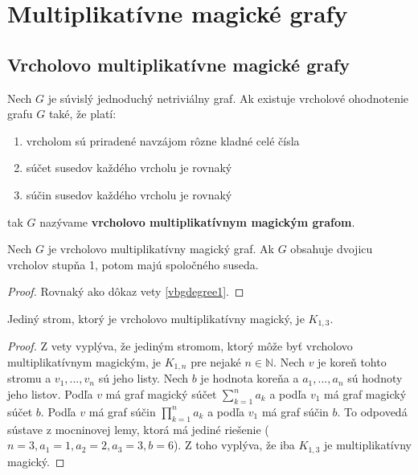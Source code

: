 \section{Multiplikatívne magické grafy}

\subsection{Vrcholovo multiplikatívne magické grafy}

\begin{definition} Nech $G$ je súvislý jednoduchý netriviálny graf. Ak existuje vrcholové ohodnotenie grafu $G$ také, že platí:

\begin{enumerate}
\item vrcholom sú priradené navzájom rôzne kladné celé čísla
\item súčet susedov každého vrcholu je rovnaký
\item súčin susedov každého vrcholu je rovnaký
\end{enumerate}

tak $G$ nazývame \textbf{vrcholovo multiplikatívnym magickým grafom}.
\end{definition} 

\begin{theorem}
\label{vmmgdegree1}
Nech $G$ je vrcholovo multiplikatívny magický graf. Ak $G$ obsahuje dvojicu vrcholov stupňa 1, potom majú spoločného suseda.
\end{theorem}

\begin{proof} Rovnaký ako dôkaz vety \ref{vbgdegree1}.
\end{proof}

\begin{consequence} Jediný strom, ktorý je vrcholovo multiplikatívny magický, je $K_{1,3}$.
\end{consequence}

\begin{proof} Z vety \label{vmmgdegree1} vyplýva, že jediným stromom, ktorý môže byť vrcholovo multiplikatívnym magickým, je $K_{1,n}$ pre nejaké $n \in \mathbb{N}$. Nech $v$ je koreň tohto stromu a $v_1, ... , v_n$ sú jeho listy. Nech $b$ je hodnota koreňa a $a_1, ... , a_n$ sú hodnoty jeho listov. Podľa $v$ má graf magický súčet $\sum_{k=1}^{n} a_k$ a podľa $v_1$ má graf magický súčet $b$. Podľa $v$ má graf súčin $\prod_{k=1}^{n} a_k$ a podľa $v_1$ má graf súčin $b$. To odpovedá sústave z mocninovej lemy, ktorá má jediné riešenie ($n = 3, a_1 = 1, a_2 = 2, a_3 = 3, b = 6$). Z toho vyplýva, že iba $K_{1,3}$ je multiplikatívny magický.
\end{proof}

